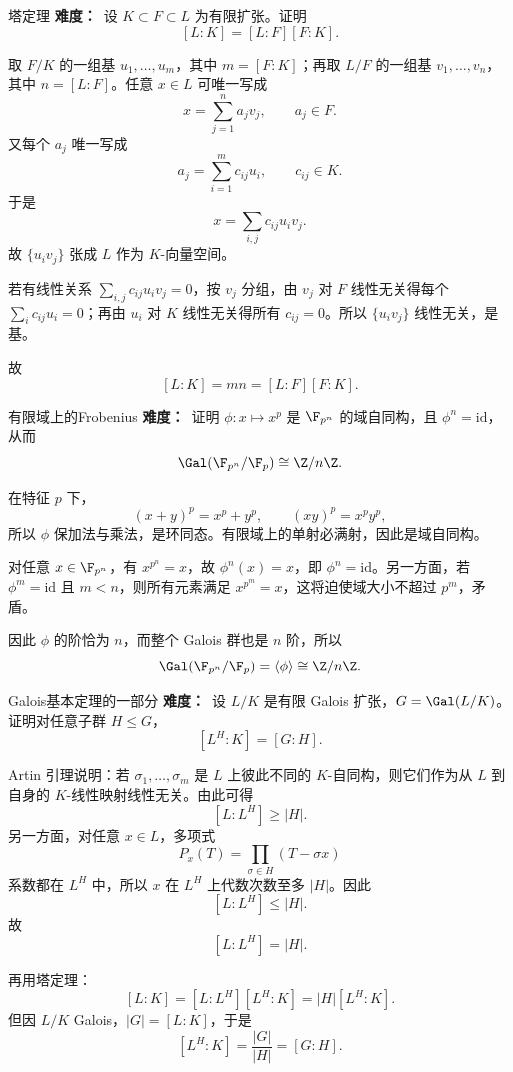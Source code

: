\begin{problem}{塔定理}
\textbf{难度：}\medium\ 设 $K\subset F\subset L$ 为有限扩张。证明
\[
[L:K]=[L:F][F:K].
\]
\end{problem}
\begin{solution}
取 $F/K$ 的一组基 $u_1,\dots,u_m$，其中 $m=[F:K]$；再取 $L/F$ 的一组基 $v_1,\dots,v_n$，其中 $n=[L:F]$。任意 $x\in L$ 可唯一写成
\[
x=\sum_{j=1}^n a_jv_j,
\qquad a_j\in F.
\]
又每个 $a_j$ 唯一写成
\[
a_j=\sum_{i=1}^m c_{ij}u_i,
\qquad c_{ij}\in K.
\]
于是
\[
x=\sum_{i,j} c_{ij}u_iv_j.
\]
故 $\{u_iv_j\}$ 张成 $L$ 作为 $K$-向量空间。

若有线性关系 $\sum_{i,j} c_{ij}u_iv_j=0$，按 $v_j$ 分组，由 $v_j$ 对 $F$ 线性无关得每个 $\sum_i c_{ij}u_i=0$；再由 $u_i$ 对 $K$ 线性无关得所有 $c_{ij}=0$。所以 $\{u_iv_j\}$ 线性无关，是基。

故
\[
[L:K]=mn=[L:F][F:K].
\]
\end{solution}

\begin{problem}{有限域上的Frobenius}
\textbf{难度：}\medium\ 证明 $\phi:x\mapsto x^p$ 是 $\F_{p^n}$ 的域自同构，且 $\phi^n=\mathrm{id}$，从而
\[
\Gal(\F_{p^n}/\F_p)\cong \Z/n\Z.
\]
\end{problem}
\begin{solution}
在特征 $p$ 下，
\[
(x+y)^p=x^p+y^p,
\qquad (xy)^p=x^py^p,
\]
所以 $\phi$ 保加法与乘法，是环同态。有限域上的单射必满射，因此是域自同构。

对任意 $x\in\F_{p^n}$，有 $x^{p^n}=x$，故 $\phi^n(x)=x$，即 $\phi^n=\mathrm{id}$。另一方面，若 $\phi^m=\mathrm{id}$ 且 $m<n$，则所有元素满足 $x^{p^m}=x$，这将迫使域大小不超过 $p^m$，矛盾。

因此 $\phi$ 的阶恰为 $n$，而整个 Galois 群也是 $n$ 阶，所以
\[
\Gal(\F_{p^n}/\F_p)=\langle\phi\rangle\cong\Z/n\Z.
\]
\end{solution}

\begin{problem}{Galois基本定理的一部分}
\textbf{难度：}\hard\ 设 $L/K$ 是有限 Galois 扩张，$G=\Gal(L/K)$。证明对任意子群 $H\le G$，
\[
[L^H:K]=[G:H].
\]
\end{problem}
\begin{solution}
Artin 引理说明：若 $\sigma_1,\dots,\sigma_m$ 是 $L$ 上彼此不同的 $K$-自同构，则它们作为从 $L$ 到自身的 $K$-线性映射线性无关。由此可得
\[
[L:L^H]\ge |H|.
\]
另一方面，对任意 $x\in L$，多项式
\[
P_x(T)=\prod_{\sigma\in H}(T-\sigma x)
\]
系数都在 $L^H$ 中，所以 $x$ 在 $L^H$ 上代数次数至多 $|H|$。因此
\[
[L:L^H]\le |H|.
\]
故
\[
[L:L^H]=|H|.
\]

再用塔定理：
\[
[L:K]=[L:L^H][L^H:K]=|H|[L^H:K].
\]
但因 $L/K$ Galois，$|G|=[L:K]$，于是
\[
[L^H:K]=\frac{|G|}{|H|}=[G:H].
\]
\end{solution}

